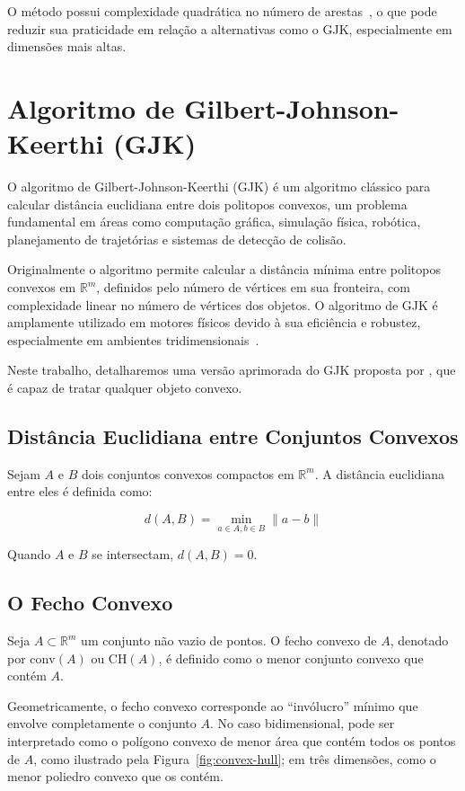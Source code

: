 O método possui complexidade quadrática no número de arestas~\cite{ericson2004real}, o que pode reduzir sua praticidade em relação a alternativas como o GJK, especialmente em dimensões mais altas.

\section{Algoritmo de Gilbert-Johnson-Keerthi (GJK)}

O algoritmo de Gilbert-Johnson-Keerthi (GJK) é um algoritmo clássico para calcular distância euclidiana entre dois politopos convexos, um problema fundamental em áreas como computação gráfica, simulação física, robótica, planejamento de trajetórias e sistemas de detecção de colisão. 

Originalmente o algoritmo permite calcular a distância mínima entre politopos convexos em $\mathbb{R}^m$, definidos pelo número de vértices em sua fronteira, com complexidade linear no número de vértices dos objetos. O algoritmo de GJK é amplamente utilizado em motores físicos devido à sua eficiência e robustez, especialmente em ambientes tridimensionais~\cite{gjk}.

Neste trabalho, detalharemos uma versão aprimorada do GJK proposta por , que é capaz de tratar qualquer objeto convexo. 

\subsection*{Distância Euclidiana entre Conjuntos Convexos}

Sejam $A$ e $B$ dois conjuntos convexos compactos em $\mathbb{R}^m$. A distância euclidiana entre eles é definida como:

$$
d(A,B) = \min_{a \in A, b \in B} \| a - b \|
$$

Quando $A$ e $B$ se intersectam, $d(A,B) = 0$.

\subsection*{O Fecho Convexo}

Seja $A \subset \mathbb{R}^m$ um conjunto não vazio de pontos. O fecho convexo de $A$, denotado por $\mathrm{conv}(A)$ ou $\mathrm{CH}(A)$, é definido como o menor conjunto convexo que contém $A$. 

Geometricamente, o fecho convexo corresponde ao ``invólucro'' mínimo que envolve completamente o conjunto $A$. No caso bidimensional, pode ser interpretado como o polígono convexo de menor área que contém todos os pontos de $A$, como ilustrado pela Figura~\ref{fig:convex-hull}; em três dimensões, como o menor poliedro convexo que os contém.


